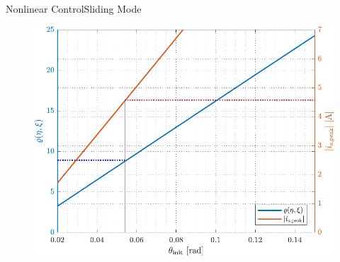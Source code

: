 \begin{frame}{Nonlinear Control}{Sliding Mode}
\small
  \begin{figure}[H]
    \includegraphics[width=.75\textwidth]{figures/chooseRho}
  \end{figure}
\normalsize
\end{frame}



